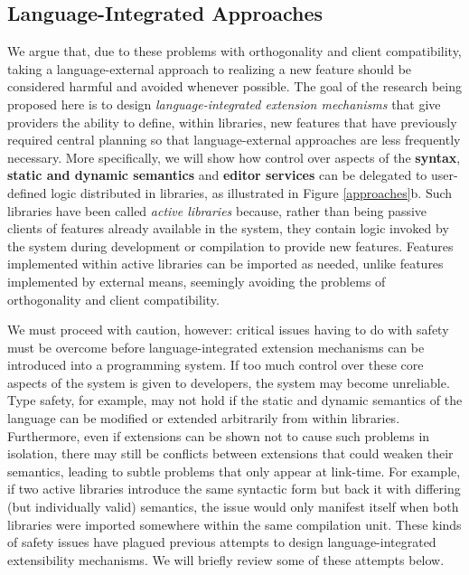 \subsection{Language-Integrated Approaches}\label{language-integrated-approaches}
We argue that, due to these problems with orthogonality and client compatibility, taking a language-external approach to realizing a new feature should be considered harmful and avoided whenever possible. The goal of the research being proposed here is to design \emph{language-integrated extension mechanisms} that give providers the ability to define, within libraries, new features that have previously required central planning
so that language-external approaches are less frequently necessary. More specifically, we will show how control over aspects of the \textbf{syntax}, \textbf{static and dynamic semantics} and \textbf{editor services} can be delegated to user-defined logic distributed in {libraries}, as illustrated in Figure \ref{approaches}b. 
Such libraries have been called \emph{active libraries}  \cite{activelibraries} because, rather than being passive clients of features already available in the system, they contain logic invoked by the system during development or compilation to provide new features. Features implemented within active libraries can be imported as needed, unlike features implemented by external means, seemingly avoiding the problems of orthogonality and client compatibility.

We must proceed with caution, however: critical issues having to do with {safety} must be overcome before language-integrated extension mechanisms can be introduced into a programming system. If too much control over  these core aspects of the system is given  to developers, the system may become unreliable. 
Type safety, for example, may not hold if the static and dynamic semantics of the language can be modified or extended arbitrarily from within libraries. Furthermore, even if extensions can be shown not to cause such problems in isolation, there may still be conflicts between extensions that could weaken their semantics, leading to subtle problems that only appear at link-time. For example, if two active libraries introduce the same syntactic form but back it with differing (but individually valid) semantics, the issue would only manifest itself when both libraries were imported somewhere within the same compilation unit. These kinds of safety issues have plagued previous attempts to design language-integrated extensibility mechanisms. We will briefly review some of these attempts below.%


